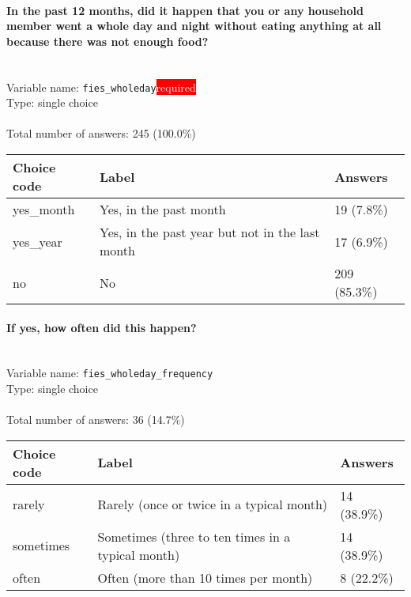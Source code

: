 \documentclass[11.5pt, a4paper]{scrartcl}
\begin{document}
\paragraph{In the past 12 months, did it happen that you or any household member went a whole day and night without eating anything at all because there was not enough food?}
\  \\Variable name: \texttt{fies\_wholeday}\hfill\colorbox{red}{\small{\textcolor{white}{required}}}\\
 Type: single choice\\
\\Total number of answers: 245 (100.0\%)
\\[0.2em] \begin{tabular}{p{4cm}|p{8cm}|p{3cm}}
Choice code & Label & Answers \\
\hline
yes\_month & Yes, in the past month& \cellcolor{color0}19 (7.8\%)\\
\cellcolor{mygray} yes\_year & \cellcolor{mygray}Yes, in the past year but not in the last month & \cellcolor{color0}17 (6.9\%)\\
no & No& \cellcolor{color4}209 (85.3\%)\\
\end{tabular}
\paragraph{If yes, how often did this happen? }
\  \\Variable name: \texttt{fies\_wholeday\_frequency}\\
Type: single choice\\
\\Total number of answers: 36 (14.7\%)
\\[0.2em] \begin{tabular}{p{4cm}|p{8cm}|p{3cm}}
Choice code & Label & Answers \\
\hline
rarely & Rarely (once or twice in a typical month)& \cellcolor{color1}14 (38.9\%)\\
\cellcolor{mygray} sometimes & \cellcolor{mygray}Sometimes (three to ten times in a typical month) & \cellcolor{color1}14 (38.9\%)\\
often & Often (more than 10 times per month)& \cellcolor{color1}8 (22.2\%)\\
\end{tabular}
\end{document}
